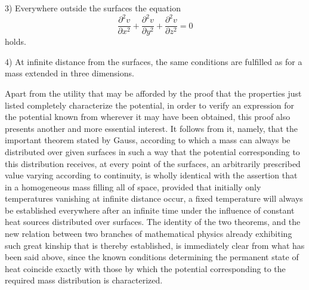 \documentclass[11pt]{article}
\begin{document}
3) Everywhere outside the surfaces the equation
\[
\frac{\partial^2 v}{\partial x^2}+\frac{\partial^2 v}{\partial y^2}+\frac{\partial^2 v}{\partial z^2}=0
\]
holds.

4) At infinite distance from the surfaces, the same conditions are fulfilled as for a mass extended in three dimensions.

Apart from the utility that may be afforded by the proof that the properties just listed completely characterize the potential, in order to verify an expression for the potential known from wherever it may have been obtained, this proof also presents another and more essential interest. It follows from it, namely, that the important theorem stated by Gauss, according to which a mass can always be distributed over given surfaces in such a way that the potential corresponding to this distribution receives, at every point of the surfaces, an arbitrarily prescribed value varying according to continuity, is wholly identical with the assertion that in a homogeneous mass filling all of space, provided that initially only temperatures vanishing at infinite distance occur, a fixed temperature will always be established everywhere after an infinite time under the influence of constant heat sources distributed over surfaces. The identity of the two theorems, and the new relation between two branches of mathematical physics already exhibiting such great kinship that is thereby established, is immediately clear from what has been said above, since the known conditions determining the permanent state of heat coincide exactly with those by which the potential corresponding to the required mass distribution is characterized.
\end{document}
